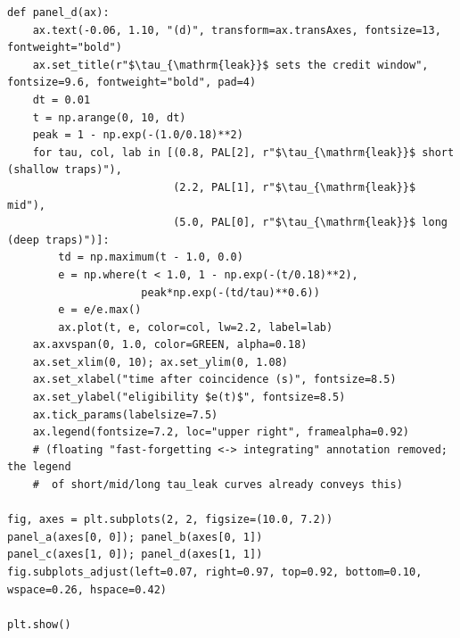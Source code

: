 \begin{lstlisting}[caption={schematics.ipynb code cell 4},label={lst:mrl-nb-schematics-4}]
def panel_d(ax):
    ax.text(-0.06, 1.10, "(d)", transform=ax.transAxes, fontsize=13, fontweight="bold")
    ax.set_title(r"$\tau_{\mathrm{leak}}$ sets the credit window", fontsize=9.6, fontweight="bold", pad=4)
    dt = 0.01
    t = np.arange(0, 10, dt)
    peak = 1 - np.exp(-(1.0/0.18)**2)
    for tau, col, lab in [(0.8, PAL[2], r"$\tau_{\mathrm{leak}}$ short (shallow traps)"),
                          (2.2, PAL[1], r"$\tau_{\mathrm{leak}}$ mid"),
                          (5.0, PAL[0], r"$\tau_{\mathrm{leak}}$ long (deep traps)")]:
        td = np.maximum(t - 1.0, 0.0)
        e = np.where(t < 1.0, 1 - np.exp(-(t/0.18)**2),
                     peak*np.exp(-(td/tau)**0.6))
        e = e/e.max()
        ax.plot(t, e, color=col, lw=2.2, label=lab)
    ax.axvspan(0, 1.0, color=GREEN, alpha=0.18)
    ax.set_xlim(0, 10); ax.set_ylim(0, 1.08)
    ax.set_xlabel("time after coincidence (s)", fontsize=8.5)
    ax.set_ylabel("eligibility $e(t)$", fontsize=8.5)
    ax.tick_params(labelsize=7.5)
    ax.legend(fontsize=7.2, loc="upper right", framealpha=0.92)
    # (floating "fast-forgetting <-> integrating" annotation removed; the legend
    #  of short/mid/long tau_leak curves already conveys this)

fig, axes = plt.subplots(2, 2, figsize=(10.0, 7.2))
panel_a(axes[0, 0]); panel_b(axes[0, 1])
panel_c(axes[1, 0]); panel_d(axes[1, 1])
fig.subplots_adjust(left=0.07, right=0.97, top=0.92, bottom=0.10, wspace=0.26, hspace=0.42)

plt.show()
\end{lstlisting}

